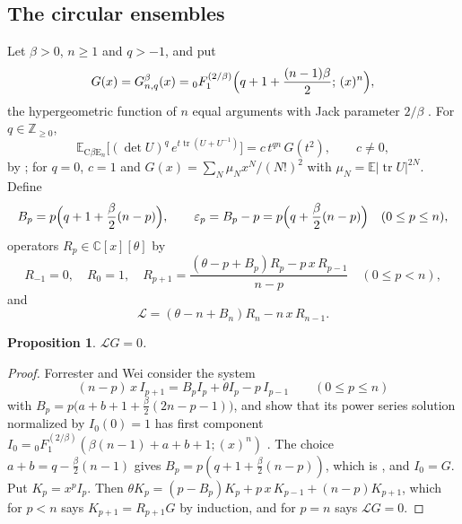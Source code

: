 \documentclass[11pt,a4paper]{article}
\newtheorem{proposition}[theorem]{Proposition}
\theoremstyle{definition}
\theoremstyle{remark}
\newcommand{\C}{\mathbb C}
\newcommand{\Z}{\mathbb Z}
\newcommand{\E}{\mathbb E}
\DeclareMathOperator{\tr}{tr}
\numberwithin{equation}{section}
\begin{document}
\subsection{The circular ensembles}
Let $\beta>0$, $n\ge1$ and $q>-1$, and put
\[
G(x)=G^{\beta}_{n,q}(x)={}_0F_1^{(2/\beta)}\Bigl(q+1+\frac{(n-1)\beta}2;\,(x)^n\Bigr),
\]
the hypergeometric function of $n$ equal arguments with Jack parameter $2/\beta$ \cite{Kan93,FW26}. For $q\in\Z_{\ge0}$,
\begin{equation}\label{V:eq:cbe-G}
\E_{\mathrm{C}\beta\mathrm{E}_n}\bigl[(\det U)^q\,e^{t\tr(U+U^{-1})}\bigr]=c\,t^{qn}\,G(t^2),\qquad c\ne0,
\end{equation}
by \cite[(2.7)]{FW26}; for $q=0$, $c=1$ and $G(x)=\sum_N\mu_Nx^N/(N!)^2$ with $\mu_N=\E|\tr U|^{2N}$. Define
\begin{equation}\label{V:eq:Bp}
B_p=p\Bigl(q+1+\frac\beta2(n-p)\Bigr),\qquad \varepsilon_p=B_p-p=p\Bigl(q+\frac\beta2(n-p)\Bigr)\quad(0\le p\le n),
\end{equation}
operators $R_p\in\C[x][\theta]$ by
\begin{equation}\label{V:eq:kac-rec}
R_{-1}=0,\quad R_0=1,\quad R_{p+1}=\frac{(\theta-p+B_p)R_p-p\,x\,R_{p-1}}{n-p}\quad(0\le p<n),
\end{equation}
and
\begin{equation}\label{V:eq:Ltheta}
\mathcal L=(\theta-n+B_n)R_n-n\,x\,R_{n-1}.
\end{equation}

\begin{proposition}\label{V:prop:cbe-op}
$\mathcal LG=0$.
\end{proposition}

\begin{proof}
Forrester and Wei \cite[Prop.~3.3]{FW26} consider the system
\begin{equation}\label{V:eq:fw-system}
(n-p)\,x\,I_{p+1}=B_pI_p+\theta I_p-p\,I_{p-1}\qquad(0\le p\le n)
\end{equation}
with $B_p=p\bigl(a+b+1+\frac\beta2(2n-p-1)\bigr)$, and show that its power series solution normalized by $I_0(0)=1$ has first component $I_0={}_0F_1^{(2/\beta)}(\beta(n-1)+a+b+1;(x)^n)$ \cite[(3.9)]{FW26}. The choice $a+b=q-\frac\beta2(n-1)$ gives $B_p=p(q+1+\frac\beta2(n-p))$, which is \cite[(3.13)]{FW26}, and $I_0=G$. Put $K_p=x^pI_p$. Then $\theta K_p=(p-B_p)K_p+p\,x\,K_{p-1}+(n-p)K_{p+1}$, which for $p<n$ says $K_{p+1}=R_{p+1}G$ by induction, and for $p=n$ says $\mathcal LG=0$.
\end{proof}
\end{document}
